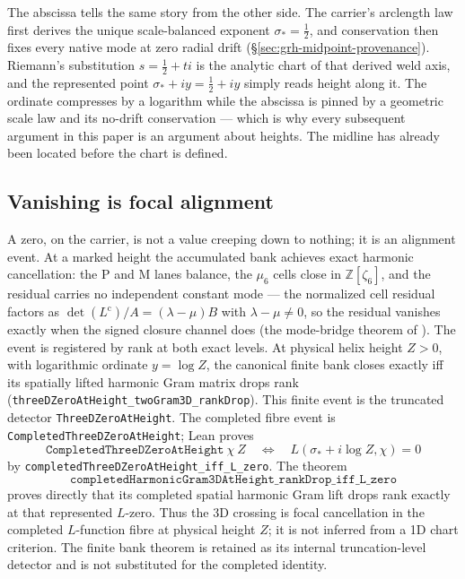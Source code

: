 \documentclass[11pt]{article}
\theoremstyle{definition}
\begin{document}
The abscissa tells the same story from the other side.  The carrier's
arclength law first derives the unique scale-balanced exponent
\(\sigma_*=\tfrac12\), and conservation then fixes every native mode at zero
radial drift (\S\ref{sec:grh-midpoint-provenance}).  Riemann's substitution
\(s=\tfrac12+ti\) is the analytic chart of that derived weld axis, and the
represented point \(\sigma_*+iy=\tfrac12+iy\) simply reads height along it.
The ordinate compresses by a logarithm while the abscissa is pinned by a
geometric scale law and its no-drift conservation --- which is why every
subsequent argument in this paper is an argument about heights.  The midline
has already been located before the chart is defined.

\subsection{Vanishing is focal alignment}\label{sec:grh-focal}

A zero, on the carrier, is not a value creeping down to nothing; it is an
alignment event. At a marked height the accumulated bank achieves exact
harmonic cancellation: the P and M lanes balance, the \(\mu_6\) cells close in
\(\mathbb Z[\zeta_6]\), and the residual carries no independent constant mode
--- the normalized cell residual factors as \(\det(L^{\mathrm c})/A=
(\lambda-\mu)B\) with \(\lambda-\mu\neq0\), so the residual vanishes exactly
when the signed closure channel does (the mode-bridge theorem of
\cite{UniversalCarrier}).
The event is registered by rank at both exact levels.  At physical helix
height \(Z>0\), with logarithmic ordinate \(y=\log Z\), the canonical finite
bank closes exactly iff its spatially lifted harmonic Gram matrix drops rank
(\texttt{threeDZeroAtHeight\_twoGram3D\_rankDrop}).  This finite event is the
truncated detector \texttt{ThreeDZeroAtHeight}.  The completed fibre event is
\texttt{CompletedThreeDZeroAtHeight}; Lean proves
\[
 \texttt{CompletedThreeDZeroAtHeight}\ \chi\ Z
 \quad\Longleftrightarrow\quad
 L(\sigma_*+i\log Z,\chi)=0
\]
by \texttt{completedThreeDZeroAtHeight\_iff\_L\_zero}.  The theorem
\[
\texttt{completedHarmonicGram3DAtHeight\_rankDrop\_iff\_L\_zero}
\]
proves directly that its completed spatial harmonic Gram lift drops rank exactly at
that represented \(L\)-zero.  Thus the
3D crossing is focal cancellation in the completed \(L\)-function fibre at
physical height \(Z\); it is not inferred from a 1D chart criterion.  The
finite bank theorem is retained as its internal truncation-level detector and
is not substituted for the completed identity.
\end{document}

